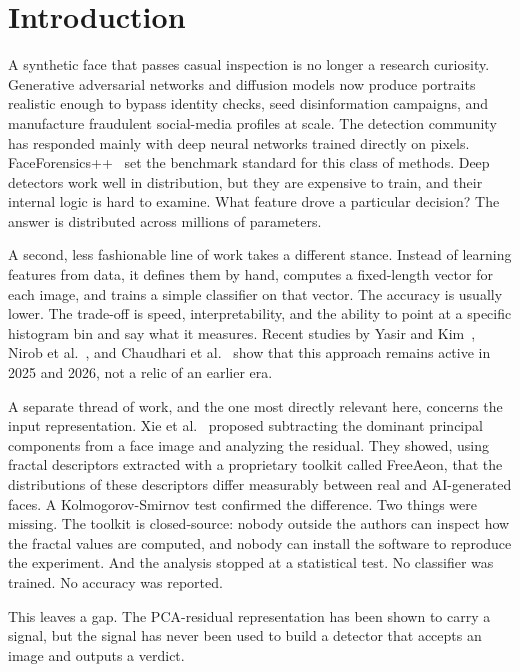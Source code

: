 \documentclass[runningheads]{llncs}
\begin{document}
\section{Introduction}

A synthetic face that passes casual inspection is no longer a research curiosity. Generative adversarial networks and diffusion models now produce portraits realistic enough to bypass identity checks, seed disinformation campaigns, and manufacture fraudulent social-media profiles at scale. The detection community has responded mainly with deep neural networks trained directly on pixels. FaceForensics++~\cite{rossler2019} set the benchmark standard for this class of methods. Deep detectors work well in distribution, but they are expensive to train, and their internal logic is hard to examine. What feature drove a particular decision? The answer is distributed across millions of parameters.

A second, less fashionable line of work takes a different stance. Instead of learning features from data, it defines them by hand, computes a fixed-length vector for each image, and trains a simple classifier on that vector. The accuracy is usually lower. The trade-off is speed, interpretability, and the ability to point at a specific histogram bin and say what it measures. Recent studies by Yasir and Kim~\cite{yasir2025}, Nirob et al.~\cite{nirob2026}, and Chaudhari et al.~\cite{chaudhari2026} show that this approach remains active in 2025 and 2026, not a relic of an earlier era.

A separate thread of work, and the one most directly relevant here, concerns the input representation. Xie et al.~\cite{xie2026} proposed subtracting the dominant principal components from a face image and analyzing the residual. They showed, using fractal descriptors extracted with a proprietary toolkit called FreeAeon, that the distributions of these descriptors differ measurably between real and AI-generated faces. A Kolmogorov-Smirnov test confirmed the difference. Two things were missing. The toolkit is closed-source: nobody outside the authors can inspect how the fractal values are computed, and nobody can install the software to reproduce the experiment. And the analysis stopped at a statistical test. No classifier was trained. No accuracy was reported.

This leaves a gap. The PCA-residual representation has been shown to carry a signal, but the signal has never been used to build a detector that accepts an image and outputs a verdict.
\end{document}
